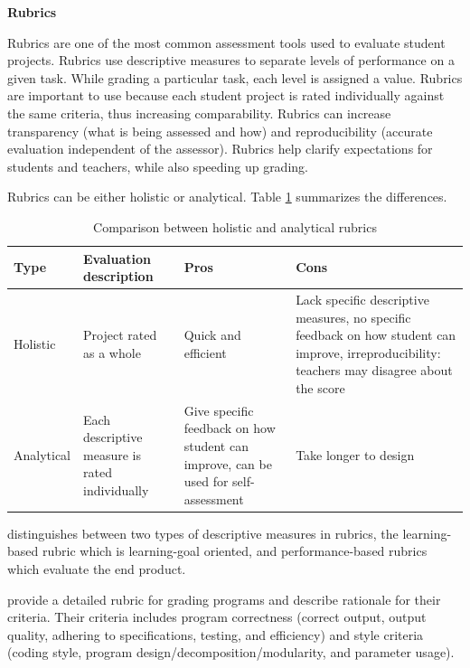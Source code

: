 \noindent \textbf{Rubrics}


Rubrics are one of the most common assessment tools used to evaluate student projects. Rubrics use descriptive measures to separate levels of performance on a given task. While grading a particular task, each level is assigned a value. Rubrics are important to use because each student project is rated individually against the same criteria, thus increasing comparability. Rubrics can increase transparency (what is being assessed and how) and reproducibility (accurate evaluation independent of the assessor). Rubrics help clarify expectations for students and teachers, while also speeding up grading\cite{catete2017framework}.



Rubrics can be either holistic or analytical. Table \ref{table:RubricsHolisticAnalytical} summarizes the differences.

\begin{table}
  \centering
\begin{tabular}{|l||p{20mm}|p{55mm}|p{65mm}|}
  \hline
  \textbf{Type} & \textbf{Evaluation description} & \textbf{Pros} & \textbf{Cons} \\
  \hline
  Holistic & Project rated as a whole & Quick and efficient & Lack specific descriptive measures, no specific feedback on how student can improve, irreproducibility: teachers may disagree about the score \cite{catete2017framework} \\ \hline
  Analytical & Each descriptive measure is rated individually & Give specific feedback on how student can improve, can be used for self-assessment & Take longer to design \\
  \hline
\end{tabular}
\caption{Comparison between holistic and analytical rubrics}\label{table:RubricsHolisticAnalytical}
\end{table}

 distinguishes between two types of descriptive measures in rubrics, the learning-based rubric which is learning-goal oriented, and performance-based rubrics which evaluate the end product.



 provide a detailed rubric for grading programs and describe rationale for their criteria. Their criteria includes
program correctness (correct output, output quality, adhering to specifications, testing, and efficiency) and style criteria (coding
style, program design/decomposition/modularity, and parameter usage).



